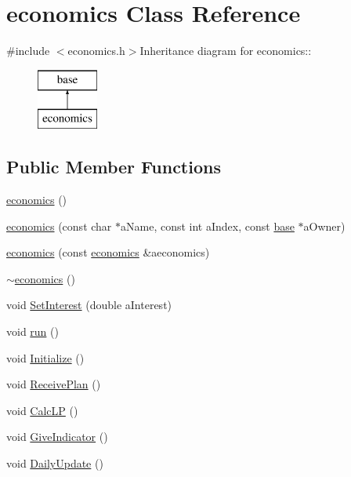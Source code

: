 \hypertarget{classeconomics}{
\section{economics Class Reference}
\label{classeconomics}
}


{\ttfamily \#include $<$economics.h$>$}Inheritance diagram for economics::\begin{figure}[H]
\begin{center}
\leavevmode
\includegraphics[height=2cm]{classeconomics}
\end{center}
\end{figure}
\subsection*{Public Member Functions}
\begin{DoxyCompactItemize}
\item 
\hyperlink{classeconomics_a2699a35c078fdc7625e7b2ce05d0790c}{economics} ()
\item 
\hyperlink{classeconomics_a2c8b403989e127fa7e56cb5a54669d03}{economics} (const char $\ast$aName, const int aIndex, const \hyperlink{classbase}{base} $\ast$aOwner)
\item 
\hyperlink{classeconomics_ae3cba9af548529209efd2d02386b2535}{economics} (const \hyperlink{classeconomics}{economics} \&aeconomics)
\item 
\hyperlink{classeconomics_a2b41b4743104166c60346e80b12c8c3e}{$\sim$economics} ()
\item 
void \hyperlink{classeconomics_a0b6096acb9522f4bcf155c15132ea0e5}{SetInterest} (double aInterest)
\item 
void \hyperlink{classeconomics_a42c3852359d9f458dba908754c1a8006}{run} ()
\item 
void \hyperlink{classeconomics_a9f6defdc19737bd99b069a7781d1ff49}{Initialize} ()
\item 
void \hyperlink{classeconomics_a4b31c145e3818a3d4ee6502914e45fd8}{ReceivePlan} ()
\item 
void \hyperlink{classeconomics_ac2c642336d04e8c35ab352d3ae0b426b}{CalcLP} ()
\item 
void \hyperlink{classeconomics_ae447147d6d743ad7549ccd263444acad}{GiveIndicator} ()
\item 
void \hyperlink{classeconomics_abdb59e181d8c9fab074c23f50ff84706}{DailyUpdate} ()
\end{DoxyCompactItemize}
